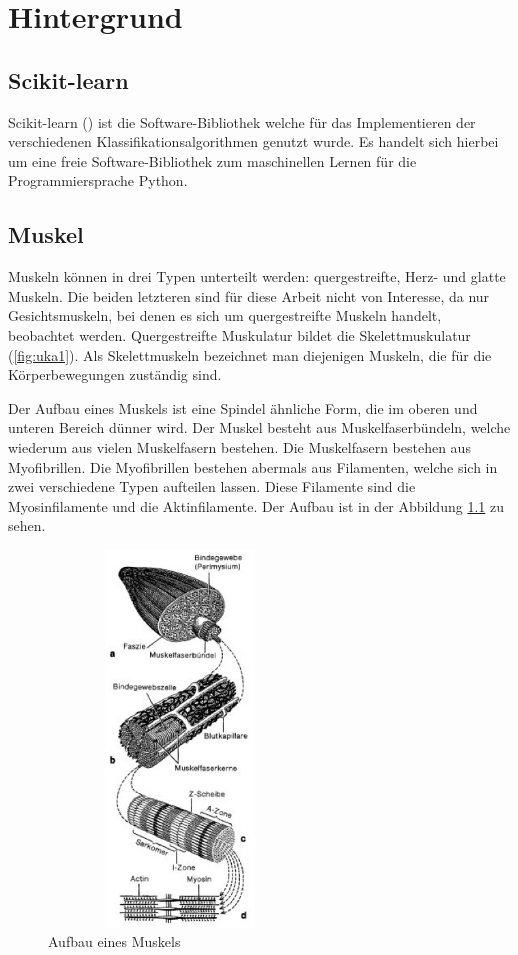 \chapter{Hintergrund}


\section{Scikit-learn}
Scikit-learn (\cite{scikit-learn}) ist die Software-Bibliothek welche für das Implementieren der verschiedenen Klassifikationsalgorithmen genutzt wurde. Es handelt sich hierbei um eine freie Software-Bibliothek zum maschinellen Lernen für die Programmiersprache Python.
 

\section{Muskel}
Muskeln können in drei Typen unterteilt werden: quergestreifte, Herz- und glatte Muskeln. Die beiden letzteren sind für diese Arbeit nicht von Interesse, da nur Gesichtsmuskeln, bei denen es sich um quergestreifte Muskeln handelt, beobachtet werden. Quergestreifte Muskulatur bildet die Skelettmuskulatur   (\ref{fig:uka1}). Als Skelettmuskeln bezeichnet man diejenigen Muskeln, die  für die  Körperbewegungen zuständig sind. \cite{trainingsworld}

Der Aufbau eines Muskels  ist eine Spindel ähnliche Form, die im oberen und unteren Bereich dünner wird.  
Der Muskel besteht aus Muskelfaserbündeln, welche wiederum aus vielen Muskelfasern bestehen. Die Muskelfasern bestehen aus Myofibrillen.
Die Myofibrillen bestehen abermals aus Filamenten, welche sich in zwei verschiedene Typen aufteilen lassen. Diese Filamente sind die Myosinfilamente und die Aktinfilamente. Der Aufbau ist in der Abbildung \ref{fig:muskel1} zu sehen. 

\begin{figure}[H]
  \centering
  \includegraphics[width=70mm,height=10cm,scale=0.6]{MuskelAufbau.png}
  \caption{Aufbau eines Muskels \cite{Spektrum}}
  \label{fig:muskel1}
\end{figure}

